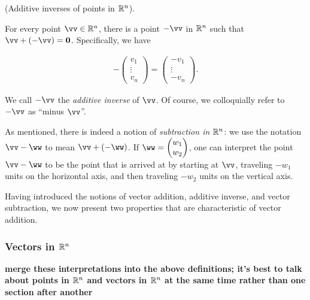 \begin{theorem}
    (Additive inverses of points in $\mathbb{R}^n$).
    
    For every point $\vv \in \R^n$, there is a point $-\vv$ in $\mathbb{R}^n$ such that $\vv + (-\vv) = \mathbf{0}$. Specifically, we have
    
    \begin{align}
        -\begin{pmatrix}
            v_1 \\ \vdots \\ v_n
        \end{pmatrix}
        =
        \begin{pmatrix}
            -v_1 \\ \vdots \\ -v_n
        \end{pmatrix}.
    \end{align}
    
    We call $-\vv$ the \textit{additive inverse} of $\vv$. Of course, we colloquially refer to $-\vv$ as ``minus $\vv$''. 
    
    As mentioned, there is indeed a notion of \textit{subtraction in $\mathbb{R}^n$}: we use the notation $\vv - \ww$ to mean $\vv + (-\ww)$. If $\ww = \begin{pmatrix} w_1 \\ w_2 \end{pmatrix}$, one can interpret the point $\vv - \ww$ to be the point that is arrived at by starting at $\vv$, traveling $-w_1$ units on the horizontal axis, and then traveling $-w_2$ units on the vertical axis.
\end{theorem}

Having introduced the notions of vector addition, additive inverse, and vector subtraction, we now present two properties that are characteristic of vector addition.

\subsubsection*{Vectors in $\mathbb{R}^n$}

\textbf{merge these interpretations into the above definitions; it's best to talk about points in $\mathbb{R}^n$ and vectors in $\mathbb{R}^n$ at the same time rather than one section after another}

